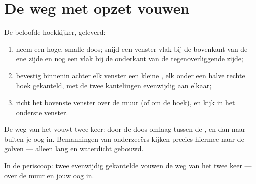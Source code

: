 \section{De weg met opzet vouwen}

\begin{method}\label{met:g5:mirrors-reflection:periscope}
De beloofde hoekkijker, geleverd:
\begin{enumerate}
  \item neem een hoge, smalle doos; snijd een venster vlak bij de
        bovenkant van de ene zijde en nog een vlak bij de onderkant
        van de tegenoverliggende zijde;
  \item bevestig binnenin achter elk venster een kleine
        , elk onder een halve rechte hoek gekanteld, met de
        twee kantelingen evenwijdig aan elkaar;
  \item richt het bovenste venster over de muur (of om de hoek), en
        kijk in het onderste venster.
\end{enumerate}
De weg van het  vouwt twee keer: door de doos omlaag tussen de
, en dan naar buiten je oog in. Bemanningen van onderzeeërs
kijken precies hiermee naar de golven --- alleen lang en waterdicht
gebouwd.
\end{method}

\begin{omfigure}

{\small In de periscoop: twee evenwijdig gekantelde  vouwen de
weg van het  twee keer --- over de muur en jouw oog in.}
\end{omfigure}

